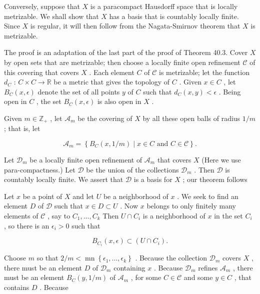 \documentclass[10pt]{article}
\begin{document}
Conversely, suppose that \(X\) is a paracompact Hausdorff space that is locally metrizable. We shall show that \(X\) has a basis that is countably locally finite. Since \(X\) is regular, it will then follow from the Nagata-Smirnov theorem that \(X\) is metrizable.

The proof is an adaptation of the last part of the proof of Theorem 40.3. Cover \(X\) by open sets that are metrizable; then choose a locally finite open refinement \(\mathcal{C}\) of this covering that covers \(X\) . Each element \(C\) of \(\mathcal{C}\) is metrizable; let the function \({d}_{C}\) : \(C \times  C \rightarrow  \mathbb{R}\) be a metric that gives the topology of \(C\) . Given \(x \in  C\) , let \({B}_{C}\left( {x,\epsilon }\right)\) denote the set of all points \(y\) of \(C\) such that \({d}_{C}\left( {x,y}\right)  < \epsilon\) . Being open in \(C\) , the set \({B}_{C}\left( {x,\epsilon }\right)\) is also open in \(X\) .

Given \(m \in  {\mathbb{Z}}_{ + }\) , let \({\mathcal{A}}_{m}\) be the covering of \(X\) by all these open balls of radius \(1/m\) ; that is, let

\[
{\mathcal{A}}_{m} = \left\{  {{B}_{C}\left( {x,1/m}\right)  \mid  x \in  C\text{ and }C \in  \mathcal{C}}\right\}  .
\]

Let \({\mathcal{D}}_{m}\) be a locally finite open refinement of \({\mathcal{A}}_{m}\) that covers \(X\) (Here we use para-compactness.) Let \(\mathcal{D}\) be the union of the collections \({\mathcal{D}}_{m}\) . Then \(\mathcal{D}\) is countably locally finite. We assert that \(\mathcal{D}\) is a basis for \(X\) ; our theorem follows

Let \(x\) be a point of \(X\) and let \(U\) be a neighborhood of \(x\) . We seek to find an element \(D\) of \(\mathcal{D}\) such that \(x \in  D \subset  U\) . Now \(x\) belongs to only finitely many elements of \(\mathcal{C}\) , say to \({C}_{1},\ldots ,{C}_{k}\) Then \(U \cap  {C}_{i}\) is a neighborhood of \(x\) in the set \({C}_{i}\) , so there is an \({\epsilon }_{i} > 0\) such that

\[
{B}_{{C}_{i}}\left( {x,\epsilon }\right)  \subset  \left( {U \cap  {C}_{i}}\right) .
\]

Choose \(m\) so that \(2/m < \operatorname{mn}\left\{  {{\epsilon }_{1},\ldots ,{\epsilon }_{k}}\right\}\) . Because the collection \({\mathcal{D}}_{m}\) covers \(X\) , there must be an element \(D\) of \({\mathcal{D}}_{m}\) containing \(x\) . Because \({\mathcal{D}}_{m}\) refines \({\mathcal{A}}_{m}\) , there must be an element \({B}_{C}\left( {y,1/m}\right)\) of \({\mathcal{A}}_{m}\) , for some \(C \in  \mathcal{C}\) and some \(y \in  C\) , that contains \(D\) . Because
\end{document}
